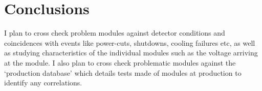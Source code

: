 \section{Conclusions}

I plan to cross check problem modules against detector conditions and
coincidences with events like power-cuts, shutdowns, cooling failures etc, as well as studying characteristics of the individual modules such as the voltage arriving at the module. I also plan to cross check problematic modules against the `production database' which details tests made of modules at production to identify any correlations. 

